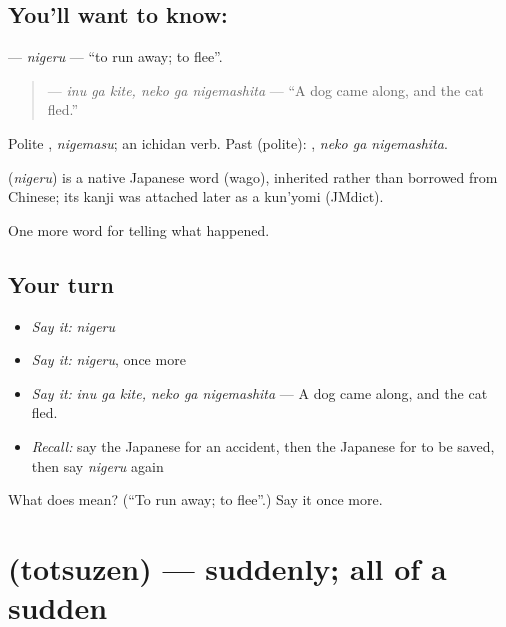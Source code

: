 \subsection*{You'll want to know: }
\textbf{} — \emph{nigeru} — \textquotedblleft{}to run away; to flee\textquotedblright{}.

\begin{quote}
\textbf{  } — \emph{inu ga kite, neko ga nigemashita} — \textquotedblleft{}A dog came along, and the cat fled.\textquotedblright{}
\end{quote}

Polite \textbf{}, \emph{nigemasu}; an ichidan verb. Past (polite): \textbf{ }, \emph{neko ga nigemashita}.

\begin{cousinweb}
\textbf{} (\emph{nigeru}) is a native Japanese word (wago), inherited rather than borrowed from Chinese; its kanji was attached later as a kun'yomi (JMdict).
\end{cousinweb}

\begin{grammarlens}[title={What you've built}]
One more word for telling what happened.
\end{grammarlens}

\subsection*{Your turn}
\begin{itemize}
\raggedright
  \item \emph{Say it:} \emph{nigeru}
  \item \emph{Say it:} \emph{nigeru}, once more
  \item \emph{Say it:} \emph{inu ga kite, neko ga nigemashita} — A dog came along, and the cat fled.
  \item \emph{Recall:} say the Japanese for an accident, then the Japanese for to be saved, then say \emph{nigeru} again
\end{itemize}

\begin{tcolorbox}[breakable,colback=teal!4,colframe=teal!35!black,title={Before you move on}]
What does  mean? (\textquotedblleft{}To run away; to flee\textquotedblright{}.) Say it once more.
\end{tcolorbox}
\section[\texorpdfstring{\ja{とつぜん} (totsuzen)}{とつぜん (totsuzen)}]{ (totsuzen) — suddenly; all of a sudden}

